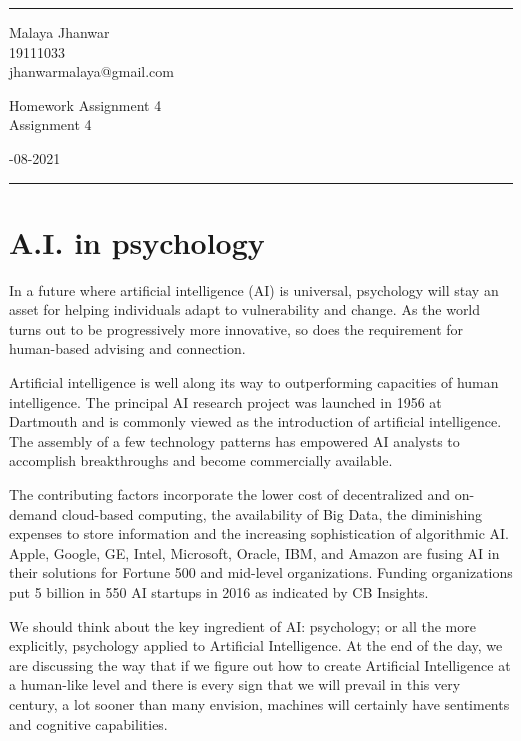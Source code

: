 \documentclass[12pt]{article}
\begin{document}

\fancyhead[C]{}
\hrule \medskip %
\begin{minipage}{0.295\textwidth} 
\raggedright
\footnotesize
Malaya Jhanwar \hfill\\   
19111033\hfill\\
jhanwarmalaya@gmail.com
\end{minipage}
\begin{minipage}{0.4\textwidth} 
\centering 
\large 
Homework Assignment 4\\ 
\normalsize 
Assignment 4\\ 
\end{minipage}
\begin{minipage}{0.295\textwidth} 
-08-2021\hfill\\
\end{minipage}
\medskip\hrule 
\bigskip


\section{\textbf{A.I. in psychology}}
In a future where artificial intelligence (AI) is universal, psychology will stay an asset for helping individuals adapt to vulnerability and change. As the world turns out to be progressively more innovative, so does the requirement for human-based advising and connection.

Artificial intelligence is well along its way to outperforming capacities of human intelligence. The principal AI research project was launched in 1956 at Dartmouth and is commonly viewed as the introduction of artificial intelligence. The assembly of a few technology patterns has empowered AI analysts to accomplish breakthroughs and become commercially available.

The contributing factors incorporate the lower cost of decentralized and on-demand cloud-based computing, the availability of Big Data, the diminishing expenses to store information and the increasing sophistication of algorithmic AI. Apple, Google, GE, Intel, Microsoft, Oracle, IBM, and Amazon are fusing AI in their solutions for Fortune 500 and mid-level organizations. Funding organizations put 5 billion in 550 AI startups in 2016 as indicated by CB Insights.

We should think about the key ingredient of AI: psychology; or all the more explicitly, psychology applied to Artificial Intelligence. At the end of the day, we are discussing the way that if we figure out how to create Artificial Intelligence at a human-like level and there is every sign that we will prevail in this very century, a lot sooner than many envision, machines will certainly have sentiments and cognitive capabilities.
\end{document}
